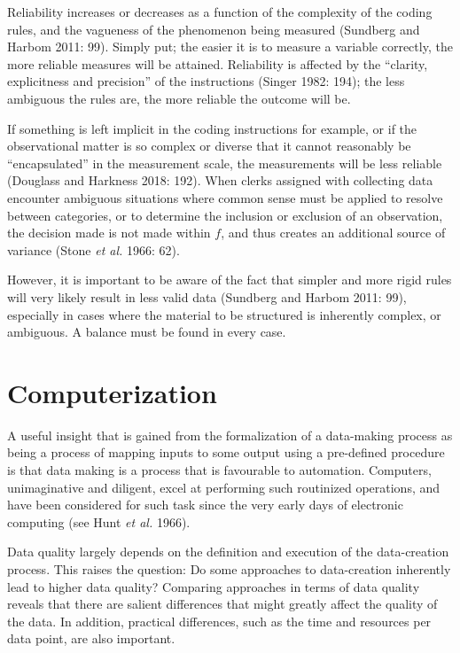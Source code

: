 \documentclass[12pt,twoside]{reedthesis}
\begin{document}
Reliability increases or decreases as a function of the complexity of
the coding rules, and the vagueness of the phenomenon being measured
(Sundberg and Harbom 2011: 99). Simply put; the easier it is to measure
a variable correctly, the more reliable measures will be attained.
Reliability is affected by the ``clarity, explicitness and precision''
of the instructions (Singer 1982: 194); the less ambiguous the rules
are, the more reliable the outcome will be.

If something is left implicit in the coding instructions for example, or
if the observational matter is so complex or diverse that it cannot
reasonably be ``encapsulated'' in the measurement scale, the
measurements will be less reliable (Douglass and Harkness 2018: 192).
When clerks assigned with collecting data encounter ambiguous situations
where common sense must be applied to resolve between categories, or to
determine the inclusion or exclusion of an observation, the decision
made is not made within \(f\), and thus creates an additional source of
variance (Stone \emph{et al.} 1966: 62).

However, it is important to be aware of the fact that simpler and more
rigid rules will very likely result in less valid data (Sundberg and
Harbom 2011: 99), especially in cases where the material to be
structured is inherently complex, or ambiguous. A balance must be found
in every case.

\section{Computerization}\label{computerization}

A useful insight that is gained from the formalization of a data-making
process as being a process of mapping inputs to some output using a
pre-defined procedure is that data making is a process that is
favourable to automation. Computers, unimaginative and diligent, excel
at performing such routinized operations, and have been considered for
such task since the very early days of electronic computing (see Hunt
\emph{et al.} 1966).

Data quality largely depends on the definition and execution of the
data-creation process. This raises the question: Do some approaches to
data-creation inherently lead to higher data quality? Comparing
approaches in terms of data quality reveals that there are salient
differences that might greatly affect the quality of the data. In
addition, practical differences, such as the time and resources per data
point, are also important.
\end{document}
